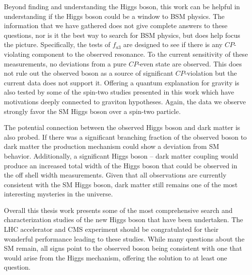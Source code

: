 Beyond finding and understanding the Higgs boson, this work can be helpful in understanding if the Higgs boson could be a window to BSM physics. The information that we have gathered does not give complete answers to these questions, nor is it the best way to search for BSM physics, but does help focus the picture. Specifically, the tests of $f_{a3}$ are designed to see if there is any $CP$-violating component to the observed resonance. To the current sensitivity of these measurements, no deviations from a pure $CP$-even state are observed. This does not rule out the observed boson as a source of significant $CP$-violation but the current data does not support it. Offering a quantum explanation for gravity is also tested by some of the spin-two studies presented in this work which have motivations deeply connected to graviton hypotheses. Again, the data we observe strongly favor the SM Higgs boson over a spin-two particle.

The potential connection between the observed Higgs boson and dark matter is also probed. If there was a significant branching fraction of the observed boson to dark matter the production mechanism could show a deviation from SM behavior. Additionally, a significant Higgs boson -- dark matter coupling would produce an increased total width of the Higgs boson that could be observed in the off shell width measurements. Given that all observations are currently consistent with the SM Higgs boson, dark matter still remains one of the most interesting mysteries in the universe.

Overall this thesis work presents some of the most comprehensive search and characterization studies of the new Higgs boson that have been undertaken. The LHC accelerator and CMS experiment should be congratulated for their wonderful performance leading to these studies. While many questions about the SM remain, all signs point to the observed boson being consistent with one that would arise from the Higgs mechanism, offering the solution to at least one question.